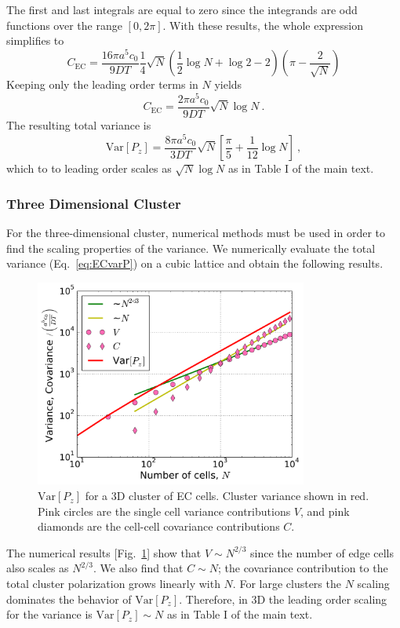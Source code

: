 The first and last integrals are equal to zero since the integrands are odd functions over the range $[0,2\pi]$. With these results, the whole expression simplifies to
\begin{equation}
    C_\text{EC} = \frac{16\pi a^5c_0}{9DT} \frac{1}{4}\sqrt{N} \left( \frac{1}{2}\log N + \log 2 -2 \right) \left( \pi - \frac{2}{\sqrt{N}} \right)
\end{equation}
Keeping only the leading order terms in $N$ yields
\begin{equation}
    C_\text{EC} = \frac{2\pi a^5c_0}{9DT} \sqrt{N} \log N \ .
\end{equation}
The resulting total variance is
\begin{equation}
    \text{Var}[P_z] = \frac{8\pi a^5c_0}{3DT} \sqrt{N} \left[ \frac{\pi}{5} +  \frac{1}{12} \log N \right] \ ,
\end{equation}
which to to leading order scales as $\sqrt{N} \log N$ as in Table I of the main text.


\subsubsection{Three Dimensional Cluster}

For the three-dimensional cluster, numerical methods must be used in order to find the scaling properties of the variance. We numerically evaluate the total variance (Eq.\ \ref{eq:ECvarP}) on a cubic lattice and obtain the following results.

\begin{figure}[ht]
    \centering
        \includegraphics[width=0.8\textwidth]{../fig/ch3_si2.png}
    \caption{$\text{Var}[P_z]$ for a 3D cluster of EC cells. Cluster variance shown in red. Pink circles are the single cell variance contributions $V$, and pink diamonds are the cell-cell covariance contributions $C$.} \label{fig:ch3_4}
\end{figure}

The numerical results [Fig.\ \ref{fig:ch3_4}] show that $V \sim N^{2/3}$ since the number of edge cells also scales as $N^{2/3}$. We also find that $C \sim N$; the covariance contribution to the total cluster polarization grows linearly with $N$. For large clusters the $N$ scaling dominates the behavior of $\text{Var}[P_z]$. Therefore, in 3D the leading order scaling for the variance is
$\text{Var}[P_z] \sim N$ as in Table I of the main text.
